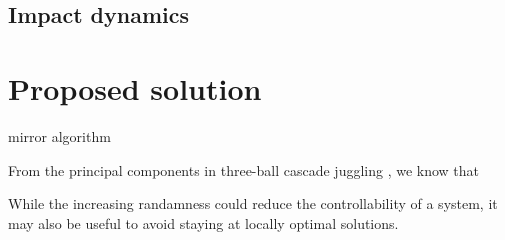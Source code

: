 \documentclass[letterpaper, 10 pt, conference]{ieeeconf}  %
\begin{document}
\subsection{Impact dynamics}

\section{Proposed solution}


mirror algorithm \cite{buehler1994planning}


From the principal components in three-ball cascade juggling \cite{post2000principal}, we know that 

While the increasing randamness could reduce the controllability of a system, it may also be useful to avoid staying at locally optimal solutions.



\end{document}
